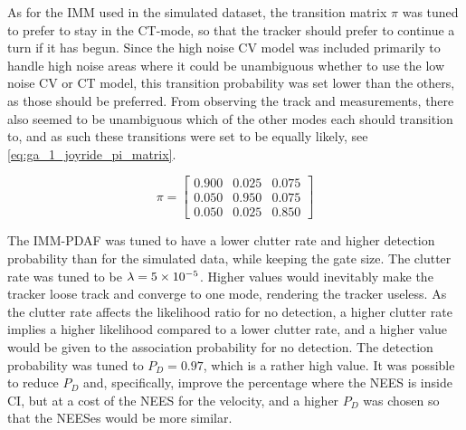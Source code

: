 As for the IMM used in the simulated dataset, the transition matrix $\pi$ was tuned to prefer to stay in the CT-mode, so that the tracker should prefer to continue a turn if it has begun. Since the high noise CV model was included primarily to handle high noise areas where it could be unambiguous whether to use the low noise CV or CT model, this transition probability was set lower than the others, as those should be preferred. From observing the track and measurements, there also seemed to be unambiguous which of the other modes each should transition to, and as such these transitions were set to be equally likely, see \cref{eq:ga_1_joyride_pi_matrix}. 

\begin{equation}
    \label{eq:ga_1_joyride_pi_matrix}
    \pi = \begin{bmatrix}
        0.900 & 0.025 & 0.075 \\
        0.050 & 0.950 & 0.075 \\
        0.050 & 0.025 & 0.850 
    \end{bmatrix}
\end{equation}

The IMM-PDAF was tuned to have a lower clutter rate and higher detection probability than for the simulated data, while keeping the gate size. The clutter rate was tuned to be $\lambda = {5} \times 10^{-5}$. Higher values would inevitably make the tracker loose track and converge to one mode, rendering the tracker useless. As the clutter rate affects the likelihood ratio for no detection, a higher clutter rate implies a higher likelihood compared to a lower clutter rate, and a higher value would be given to the association probability for no detection. The detection probability was tuned to $P_D = 0.97$, which is a rather high value. It was possible to reduce $P_D$ and, specifically, improve the percentage where the NEES is inside CI, but at a cost of the NEES for the velocity, and a higher $P_D$ was chosen so that the NEESes would be more similar. 




